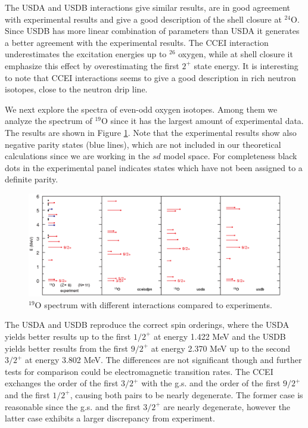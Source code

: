 \documentclass[12pt,a4paper]{article}
\begin{document}
The USDA and USDB interactions give similar results,  are in good agreement with experimental results and give a good description of the shell closure at $^{24}$O. Since USDB has more linear combination of parameters than USDA it generates a better agreement with the experimental results. 
The CCEI interaction underestimates the excitation energies up to $^{26}$ oxygen, while at shell closure it emphasize this effect by overestimating the first $2^+$ state energy. 
It is interesting to note that CCEI interactions seems to give a good description in rich neutron isotopes, close to the neutron drip line.

We next explore the spectra of even-odd oxygen isotopes. Among them we analyze the spectrum of $^{19}$O since it has the largest amount of experimental data. The results are shown in Figure \ref{fig:19O}. Note that the experimental results show also negative parity states (blue lines), which are not included in our theoretical calculations since we are working in the $sd$ model space. For completeness black dots in the experimental panel indicates states which have not been assigned to a definite parity.
\begin{figure}[htb!]
\centering
\includegraphics[width=\textwidth]{19O.eps}
\caption{$^{19}$O spectrum with different interactions compared to experiments.}
\label{fig:19O}
\end{figure}

The USDA and USDB reproduce the correct spin orderings, where the USDA yields better results up to the first $1/2^+$ at energy 1.422 MeV and the USDB yields better results from the first $9/2^+$ at energy 2.370 MeV up to the second $3/2^+$ at energy 3.802 MeV. The differences are not significant though and further tests for comparison could be electromagnetic transition rates.
The CCEI exchanges the order of the first $3/2^+$ with the g.s. and the order of the first $9/2^+$ and the first $1/2^+$, causing both pairs to be nearly degenerate. The former case is reasonable since the g.s. and the first $3/2^+$ are nearly degenerate,  however the latter case exhibits a larger discrepancy from experiment.
\end{document}
